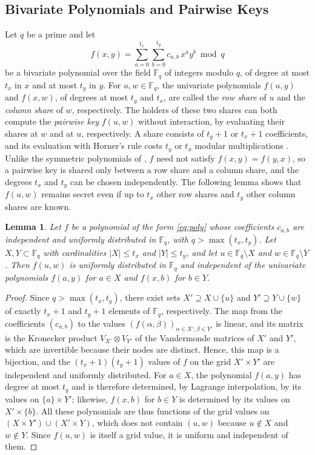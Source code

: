 \documentclass[journal]{IEEEtran}
\theoremstyle{plain}
\newtheorem{lemma}{Lemma}
\theoremstyle{definition}
\begin{document}
\subsection{Bivariate Polynomials and Pairwise Keys}\label{sec:poly}
Let $q$ be a prime and let
\begin{equation}\label{eq:poly}
f(x,y)=\sum_{a=0}^{t_x}\sum_{b=0}^{t_y} c_{a,b}\,x^a y^b \bmod q
\end{equation}
be a bivariate polynomial over the field $\mathbb{F}_q$ of integers modulo $q$, of degree at most $t_x$ in $x$ and at most $t_y$ in $y$. For $u,w\in\mathbb{F}_q$, the univariate polynomials $f(u,y)$ and $f(x,w)$, of degrees at most $t_y$ and $t_x$, are called the \emph{row share} of $u$ and the \emph{column share} of $w$, respectively. The holders of these two shares can both compute the \emph{pairwise key} $f(u,w)$ without interaction, by evaluating their shares at $w$ and at $u$, respectively. A share consists of $t_y+1$ or $t_x+1$ coefficients, and its evaluation with Horner's rule costs $t_y$ or $t_x$ modular multiplications \cite{knuth1997art}. Unlike the symmetric polynomials of \cite{blundo1993perfectly}, $f$ need not satisfy $f(x,y)=f(y,x)$, so a pairwise key is shared only between a row share and a column share, and the degrees $t_x$ and $t_y$ can be chosen independently. The following lemma shows that $f(u,w)$ remains secret even if up to $t_x$ other row shares and $t_y$ other column shares are known.

\begin{lemma}\label{lem:poly}
Let $f$ be a polynomial of the form \eqref{eq:poly} whose coefficients $c_{a,b}$ are independent and uniformly distributed in $\mathbb{F}_q$, with $q>\max(t_x,t_y)$. Let $X,Y\subset\mathbb{F}_q$ with cardinalities $|X|\le t_x$ and $|Y|\le t_y$, and let $u\in\mathbb{F}_q\setminus X$ and $w\in\mathbb{F}_q\setminus Y$. Then $f(u,w)$ is uniformly distributed in $\mathbb{F}_q$ and independent of the univariate polynomials $f(a,y)$ for $a\in X$ and $f(x,b)$ for $b\in Y$.
\end{lemma}
\begin{proof}
Since $q>\max(t_x,t_y)$, there exist sets $X'\supseteq X\cup\{u\}$ and $Y'\supseteq Y\cup\{w\}$ of exactly $t_x+1$ and $t_y+1$ elements of $\mathbb{F}_q$, respectively. The map from the coefficients $(c_{a,b})$ to the values $(f(\alpha,\beta))_{\alpha\in X',\beta\in Y'}$ is linear, and its matrix is the Kronecker product $V_{X'}\otimes V_{Y'}$ of the Vandermonde matrices of $X'$ and $Y'$, which are invertible because their nodes are distinct. Hence, this map is a bijection, and the $(t_x+1)(t_y+1)$ values of $f$ on the grid $X'\times Y'$ are independent and uniformly distributed. For $a\in X$, the polynomial $f(a,y)$ has degree at most $t_y$ and is therefore determined, by Lagrange interpolation, by its values on $\{a\}\times Y'$; likewise, $f(x,b)$ for $b\in Y$ is determined by its values on $X'\times\{b\}$. All these polynomials are thus functions of the grid values on $(X\times Y')\cup(X'\times Y)$, which does not contain $(u,w)$ because $u\notin X$ and $w\notin Y$. Since $f(u,w)$ is itself a grid value, it is uniform and independent of them.
\end{proof}
\end{document}

